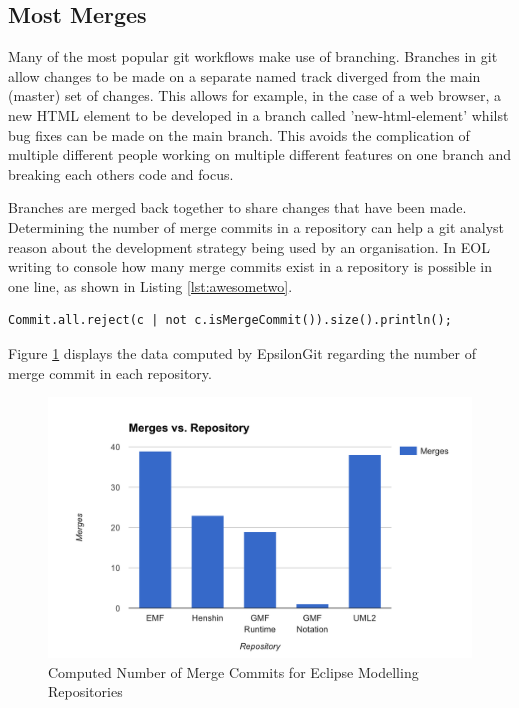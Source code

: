 \documentclass[runningheads,a4paper]{llncs}
\begin{document}
\subsection{Most Merges}
Many of the most popular git workflows make use of branching. Branches in git allow changes to be made on a separate named track diverged from the main (master) set of changes. This allows for example, in the case of a web browser, a new HTML element to be developed in a branch called 'new-html-element' whilst bug fixes can be made on the main branch. This avoids the complication of multiple different people working on multiple different features on one branch and breaking each others code and focus.

Branches are merged back together to share changes that have been made. Determining the number of merge commits in a repository can help a git analyst reason about the development strategy being used by an organisation. In EOL writing to console how many merge commits exist in a repository is possible in one line, as shown in Listing \ref{lst:awesometwo}.

\begin{lstlisting}[caption=Printing number of merge commits in a repository to console, label=lst:awesometwo]
Commit.all.reject(c | not c.isMergeCommit()).size().println();
\end{lstlisting}

Figure \ref{fig:mm} displays the data computed by EpsilonGit regarding the number of merge commit in each repository.

\begin{figure}[h]
	\centering
	\includegraphics[width=\textwidth]{../thesis/images/mostmerges}
	\caption{Computed Number of Merge Commits for Eclipse Modelling Repositories}
	\label{fig:mm}
\end{figure} 
\end{document}
